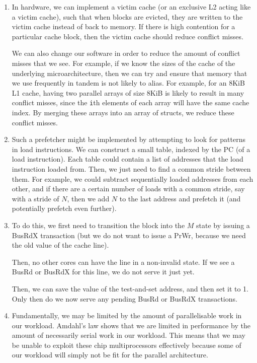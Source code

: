 


\begin{enumerate}[label=(\alph*)]
  \item
    In hardware, we can implement a victim cache (or an exclusive L2 acting like a victim cache), such that when blocks are evicted, they are written to the victim cache instead of back to memory. If there is high contention for a particular cache block, then the victim cache should reduce conflict misses.

    We can also change our software in order to reduce the amount of conflict misses that we see. For example, if we know the sizes of the cache of the underlying microarchitecture, then we can try and ensure that memory that we use frequently in tandem is not likely to alias. For example, for an 8KiB L1 cache, having two parallel arrays of size 8KiB is likely to result in many conflict misses, since the \texttt{i}th elements of each array will have the same cache index. By merging these arrays into an array of structs, we reduce these conflict misses.



  \item
    Such a prefetcher might be implemented by attempting to look for patterns in load instructions. We can construct a small table, indexed by the PC (of a load instruction). Each table could contain a list of addresses that the load instruction loaded from. Then, we just need to find a common stride between them. For example, we could subtract sequentially loaded addresses from each other, and if there are a certain number of loads with a common stride, say with a stride of $N$, then we add $N$ to the last address and prefetch it (and potentially prefetch even further).

  \item
    To do this, we first need to transition the block into the $M$ state by issuing a BusRdX transaction (but we do not want to issue a PrWr, because we need the old value of the cache line).

    Then, no other cores can have the line in a non-invalid state. If we see a BusRd or BusRdX for this line, we do not serve it just yet.

    Then, we can save the value of the test-and-set address, and then set it to 1. Only then do we now serve any pending BusRd or BusRdX transactions.

  \item
    Fundamentally, we may be limited by the amount of parallelisable work in our workload. Amdahl's law shows that we are limited in performance by the amount of necessarily serial work in our workload. This means that we may be unable to exploit these chip multiprocessors effectively because some of our workload will simply not be fit for the parallel architecture.


\end{enumerate}
